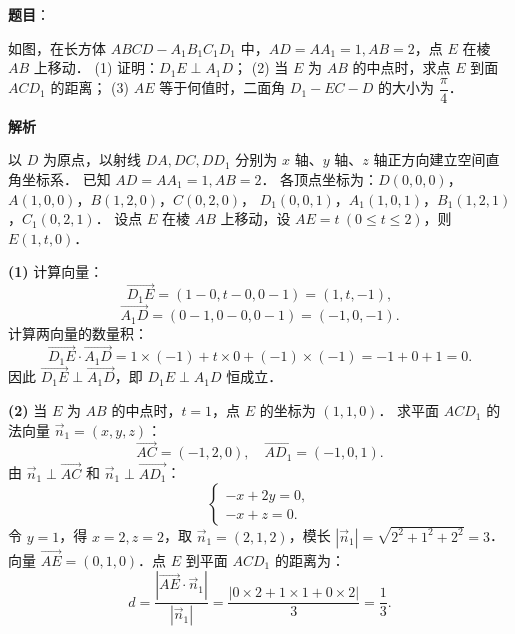 \begin{answer}

\textbf{题目}：

如图，在长方体 $ABCD - A_1B_1C_1D_1$ 中，$AD = AA_1 = 1, AB = 2$，点 $E$ 在棱 $AB$ 上移动．
(1) 证明：$D_1E \perp A_1D$；
(2) 当 $E$ 为 $AB$ 的中点时，求点 $E$ 到面 $ACD_1$ 的距离；
(3) $AE$ 等于何值时，二面角 $D_1 - EC - D$ 的大小为 $\dfrac{\pi}{4}$．
\nopagebreak[4]
\begin{center}\end{center}
\nopagebreak[4]
\textbf{解析}

以 $D$ 为原点，以射线 $DA, DC, DD_1$ 分别为 $x$ 轴、$y$ 轴、$z$ 轴正方向建立空间直角坐标系．
已知 $AD = AA_1 = 1, AB = 2$．
各顶点坐标为：$D(0, 0, 0)$，$A(1, 0, 0)$，$B(1, 2, 0)$，$C(0, 2, 0)$，
$D_1(0, 0, 1)$，$A_1(1, 0, 1)$，$B_1(1, 2, 1)$，$C_1(0, 2, 1)$．
设点 $E$ 在棱 $AB$ 上移动，设 $AE = t\ (0 \leqslant t \leqslant 2)$，则 $E(1, t, 0)$．

\textbf{(1)}
计算向量：
\nopagebreak[4]
\[
\vec{D_1E} = (1 - 0, t - 0, 0 - 1) = (1, t, -1),
\]
\nopagebreak[4]
\[
\vec{A_1D} = (0 - 1, 0 - 0, 0 - 1) = (-1, 0, -1).
\]
计算两向量的数量积：
\nopagebreak[4]
\[
\vec{D_1E} \cdot \vec{A_1D} = 1 \times (-1) + t \times 0 + (-1) \times (-1) = -1 + 0 + 1 = 0.
\]
因此 $\vec{D_1E} \perp \vec{A_1D}$，即 $D_1E \perp A_1D$ 恒成立．

\textbf{(2)}
当 $E$ 为 $AB$ 的中点时，$t = 1$，点 $E$ 的坐标为 $(1, 1, 0)$．
求平面 $ACD_1$ 的法向量 $\vec{n}_1 = (x, y, z)$：
\nopagebreak[4]
\[
\vec{AC} = (-1, 2, 0), \quad \vec{AD_1} = (-1, 0, 1).
\]
由 $\vec{n}_1 \perp \vec{AC}$ 和 $\vec{n}_1 \perp \vec{AD_1}$：
\nopagebreak[4]
\[
\begin{cases} -x + 2y = 0, \\ -x + z = 0. \end{cases}
\]
令 $y = 1$，得 $x = 2, z = 2$，取 $\vec{n}_1 = (2, 1, 2)$，模长 $|\vec{n}_1| = \sqrt{2^2 + 1^2 + 2^2} = 3$．
向量 $\vec{AE} = (0, 1, 0)$．点 $E$ 到平面 $ACD_1$ 的距离为：
\nopagebreak[4]
\[
d = \dfrac{|\vec{AE} \cdot \vec{n}_1|}{|\vec{n}_1|} = \dfrac{|0 \times 2 + 1 \times 1 + 0 \times 2|}{3} = \dfrac{1}{3}.
\]


\end{answer}
